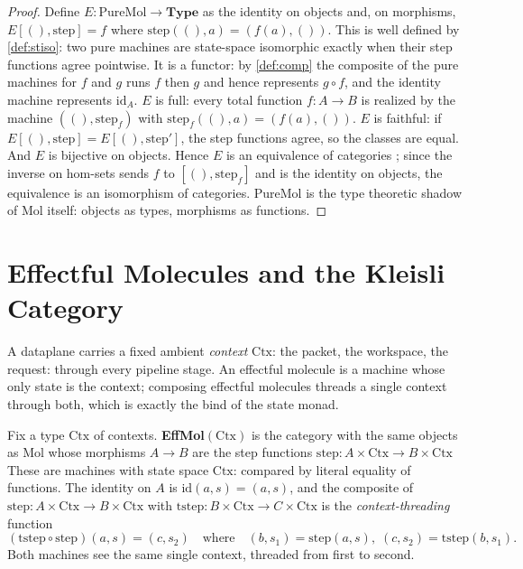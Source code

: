 \begin{proof}
Define $E : \mathrm{PureMol} \to \mathbf{Type}$ as the identity on objects
and, on morphisms,
$E[(), \mathrm{step}] = f$ where $\mathrm{step} ((), a) = (f (a), ())$. This is
well defined by \autoref{def:stiso}: two pure machines are state-space
isomorphic exactly when their step functions agree pointwise. It is a
functor: by \autoref{def:comp} the composite of the pure machines for $f$ and
$g$ runs $f$ then $g$ and hence represents $g \circ f$, and the identity
machine represents $\mathrm{id}_A$. $E$ is full: every total function
$f : A \to B$ is realized by the machine $((), \mathrm{step}_f)$ with
$\mathrm{step}_f ((), a) = (f (a), ())$. $E$ is faithful: if
$E[(), \mathrm{step}] = E[(), \mathrm{step}']$, the step functions agree, so
the classes are equal. And $E$ is bijective on objects. Hence $E$ is an
equivalence of categories \citep{maclane}; since the inverse on hom-sets
sends $f$ to $[(), \mathrm{step}_f]$ and is the identity on objects, the
equivalence is an isomorphism of categories. PureMol is the type
theoretic shadow of Mol itself: objects as types, morphisms as functions.
\end{proof}

\section{Effectful Molecules and the Kleisli Category}\label{sec:mol-eff}

A dataplane carries a fixed ambient \emph{context} $\mathrm{Ctx}$: the
packet, the workspace, the request: through every pipeline stage. An
effectful molecule is a machine whose only state is the context; composing
effectful molecules threads a single context through both, which is exactly
the bind of the state monad.

\begin{definition}[EffMol]\label{def:effmol}
Fix a type $\mathrm{Ctx}$ of contexts. \textbf{EffMol}$(\mathrm{Ctx})$ is the
category with the same objects as Mol whose morphisms $A \to B$ are the step
functions $\mathrm{step} : A \times \mathrm{Ctx} \to B \times \mathrm{Ctx}$
These are machines with state space $\mathrm{Ctx}$: compared by literal equality
of functions. The identity on $A$ is $\mathrm{id} (a, s) = (a, s)$, and the
composite of $\mathrm{step} : A \times \mathrm{Ctx} \to B \times \mathrm{Ctx}$
with $\mathrm{tstep} : B \times \mathrm{Ctx} \to C \times \mathrm{Ctx}$ is the
\emph{context-threading} function
\[ (\mathrm{tstep} \circ \mathrm{step})(a, s) = (c, s_2)
   \quad\text{where}\quad (b, s_1) = \mathrm{step} (a, s),\; (c, s_2)
   = \mathrm{tstep} (b, s_1) . \]
Both machines see the same single context, threaded from first to second.
\end{definition}

